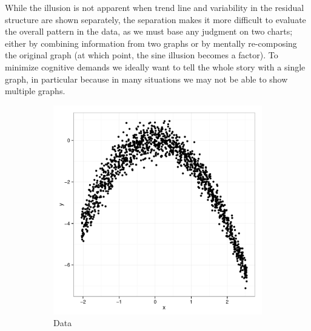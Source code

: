 \documentclass[11pt]{isuthesis}\usepackage[]{graphicx}\usepackage[]{color}
\begin{document}
While the illusion is not apparent when trend line and variability in the  residual structure are shown separately, the separation 
makes it  more difficult to evaluate the overall  pattern in the data, as we  must base any judgment on two charts; either by combining information from two graphs or by mentally re-composing the original graph (at which point, the sine illusion becomes a factor). To minimize cognitive demands we ideally want to tell the whole story with a single graph, in particular because in many situations we may not be able to show multiple graphs. 


\begin{figure} \hfill
\begin{subfigure}[b]{.45\textwidth}
  \centering
  \includegraphics[width=\textwidth]{fig-cleveland1}
  \caption{\small Data}
  \label{fig:clevelandsubfig1}
\end{subfigure} \hfill\hfill
\begin{subfigure}[b]{.45\textwidth}
  \centering

\end{subfigure}
\end{figure}
\end{document}
